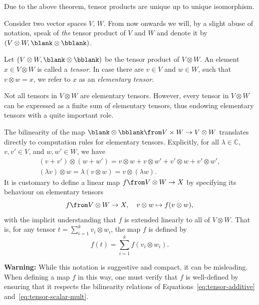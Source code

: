 \documentclass[a4paper,oneside, 12pt]{amsart}
\begin{document}
Due to the above theorem, tensor products are unique up to unique isomorphism.
\begin{notation}
  Consider two vector spaces \(V\), \(W\).
  From now onwards we will, by a slight abuse of notation, speak of \emph{the} tensor product of \(V\) and \(W\) and denote it by \((V\otimes W, \blank \otimes \bblank)\).
\end{notation}

\begin{definition}\label{def:elementary-tensors}
  Let \((V \otimes W, \blank \otimes \bblank)\) be the tensor product of \(V \otimes W\).
  An element \(x\in V\otimes W\) is called a \emph{tensor}.
  In case there are \(v\in V\) and \(w\in W\), such that \(v\otimes w = x\), we refer to \(x\) as an \emph{elementary tensor}.
\end{definition}

Not all tensors in \( V \otimes W \) are elementary tensors.
However, every tensor in \( V \otimes W \) can be expressed as a finite sum of elementary tensors, thus endowing elementary tensors with a quite important role.

\begin{remark}\label{rmk:bilinearity-on-the-level-of-elementary-tensors}
  The bilinearity of the  map \( \blank \otimes \bblank \from V\times W \to V\otimes W\) translates directly to computation rules for elementary tensors.
  Explicitly, for all \(\lambda \in \mathbb{C}\), \(v, v' \in V\), and \(w, w' \in W\), we have
  \begin{subequations}
    \begin{gather}
      (v+v')\otimes (w+w') = v\otimes w + v \otimes w' + v' \otimes w + v' \otimes w', \label{eq:tensor-additive}\\
      (\lambda v) \otimes w = \lambda(v\otimes w) = v \otimes (\lambda w).\label{eq:tensor-scalar-mult}
    \end{gather}
  \end{subequations}
  It is customary to define a linear map \( f \from V \otimes W \to X \) by specifying its behaviour on elementary tensors
  \begin{equation*}
    f \from V \otimes W \to X, \quad v \otimes w \mapsto f(v \otimes w),
  \end{equation*}
  with the implicit understanding that \( f \) is extended linearly to all of \( V \otimes W \).
  That is, for any tensor \( t = \sum_{i=1}^k v_i \otimes w_i \), the map \( f \) is defined by
  \begin{equation*}
    f(t) = \sum_{i=1}^k f(v_i \otimes w_i).
  \end{equation*}

  \textbf{Warning:} While this notation is suggestive and compact, it can be misleading.
  When defining a map \( f \) in this way, one must verify that \( f \) is well-defined by ensuring that it respects the bilinearity relations of Equations~\eqref{eq:tensor-additive} and~\eqref{eq:tensor-scalar-mult}.
\end{remark}
\end{document}
